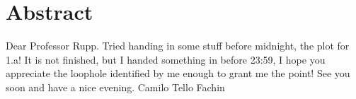 
\section*{Abstract}
Dear Professor Rupp. Tried handing in some stuff before midnight, the plot for 1.a!
It is not finished, but I handed something in before 23:59, I hope you appreciate the loophole identified by me enough to grant me the point!
See you soon and have a nice evening. Camilo Tello Fachin